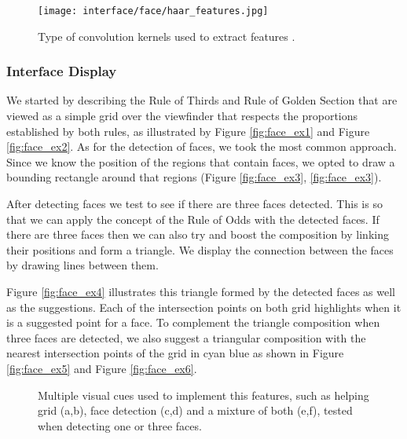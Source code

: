 \begin{figure}[htb]
	\centering
	\texttt{[image: interface/face/haar\_features.jpg]}
  	\caption{Type of convolution kernels used to extract features \cite{OCV}.}
	\label{fig:haar_features}
\end{figure}

\subsubsection{Interface Display}

We started by describing the Rule of Thirds and Rule of Golden Section that are viewed as a simple grid over the viewfinder that respects the proportions established by both rules, as illustrated by Figure \ref{fig:face_ex1} and Figure \ref{fig:face_ex2}.
As for the detection of faces, we took the most common approach. Since we know the position of the regions that contain faces, we opted to draw a bounding rectangle around that regions (Figure \ref{fig:face_ex3}, \ref{fig:face_ex3}).

After detecting faces we test to see if there are three faces detected. This is so that we can apply the concept of the Rule of Odds with the detected faces. If there are three faces then we can also try and boost the composition by linking their positions and form a triangle. We display the connection between the faces by drawing lines between them.

Figure \ref{fig:face_ex4} illustrates this triangle formed by the detected faces as well as the suggestions. Each of the intersection points on both grid highlights when it is a suggested point for a face. To complement the triangle composition when three faces are detected, we also suggest a triangular composition with the nearest intersection points of the grid in cyan blue as shown in Figure \ref{fig:face_ex5} and Figure \ref{fig:face_ex6}.
\begin{figure}[htbp]
	\centering
  	\caption{Multiple visual cues used to implement this features, such as helping grid (a,b), face detection (c,d) and a mixture of both (e,f), tested when detecting one or three faces.}
	\label{fig:face_interface}
\end{figure}

